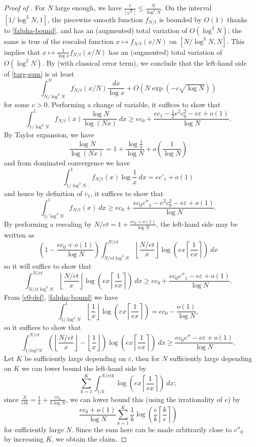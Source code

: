 \documentclass[10pt,a4paper,reqno]{amsart}
\numberwithin{equation}{section}
\theoremstyle{plain}
\theoremstyle{definition}
\newcommand\eps{\varepsilon}
\begin{document}
\begin{proof}[Proof of ]
    For $N$ large enough, we have $\frac{t}{\lfloor\sqrt{t}\rfloor} \leq \frac{N}{\log^3 N}$.
    On the interval $[1/\log^3 N,1]$, the piecewise smooth function $f_{N/t}$ is bounded by $O(1)$ thanks to \eqref{falpha-bound}, and has an (augmented) total variation of $O(\log^3\! N)$; the same is true of the rescaled function $x \mapsto f_{N/t}(x/N)$ on $[N/\log^3\! N,N]$.   This implies that $x \mapsto \frac{1}{\log x} f_{N/t}(x/N)$ has an (augmented) total variation of $O(\log^2 N)$.
   By  (with classical error term), we conclude that the left-hand side of \eqref{targ-sum} is at least
    $$ \int_{N/\log^3 N}^N f_{N/t}(x/N) \frac{dx}{\log x} + O\left( N \exp(-c\sqrt{\log N}) \right)$$
    for some $c>0$.  Performing a change of variable, it suffices to show that
    $$  \int_{1/\log^3 N}^1 f_{N/t}(x) \frac{\log N}{\log(Nx)}\ dx
    \geq  ec_0 + \frac{ec_1 - \frac{1}{2} e^2 c_0^2 - e \eps + o(1)}{\log N}.$$
    By Taylor expansion, we have
    $$ \frac{\log N}{\log(Nx)} = 1 + \frac{\log \frac{1}{x}}{\log N}  + o\left(\frac{1}{\log N}\right)$$
    and from dominated convergence we have
  $$
  \int_{1/\log^3 N}^1 f_{N/t}(x) \log \frac{1}{x}\ dx = ec'_1 + o(1)$$
and hence by definition of $c_1$, it suffices to show that
$$  \int_{1/\log^3 N}^1 f_{N/t}(x)\ dx
\geq  ec_0 + \frac{ec_0 c''_1 - e^2 c_0^2 - e\eps + o(1)}{\log N}.$$
By performing a rescaling by $N/et = 1 + \frac{ec_0+o(1)}{\log N}$, the left-hand side may be written as
$$ \left(1 - \frac{ec_0+o(1)}{\log N}\right) \int_{N/et\log^3 N}^{N/et}
\left\lfloor \frac{N/et}{x} \right\rfloor \log\left(ex \left\lceil \frac{1}{ex} \right\rceil \right)\ dx$$
so it will suffice to show that
$$
\int_{N/et\log^3 N}^{N/et}
\left\lfloor \frac{N/et}{x} \right\rfloor \log\left(ex \left\lceil \frac{1}{ex} \right\rceil \right)\ dx \geq ec_0 + \frac{ec_0 c''_1 - e\eps + o(1)}{\log N}.$$
From \eqref{c0-def}, \eqref{falpha-bound} we have
$$ \int_{1/\log^2 N}^1 \left\lfloor \frac{1}{x} \right\rfloor \log\left(ex \left\lceil \frac{1}{ex} \right\rceil \right) = ec_0 - \frac{o(1)}{\log N},$$
so it suffices to show that
$$
\int_{1/log^2 N}^{N/et}
\left(\left\lfloor \frac{N/et}{x} \right\rfloor - \left\lfloor \frac{1}{x} \right\rfloor\right) \log\left(ex \left\lceil \frac{1}{ex} \right\rceil \right)\ dx \geq \frac{ec_0 c'' - e\eps + o(1)}{\log N}.$$
Let $K$ be sufficiently large depending on $\eps$, then for $N$ sufficiently large depending on $K$ we can lower bound the left-hand side by
$$ \sum_{k=1}^K \int_{1/k}^{N/etk} \log\left(ex \left\lceil \frac{1}{ex} \right\rceil \right)\ dx;$$
since $\frac{N}{etk} = \frac{1}{k} + \frac{ec_0}{k \log N}$, we can lower bound this (using the irrationality of $e$) by
$$ \frac{ec_0+o(1)}{\log N} \sum_{k=1}^K \frac{1}{k} \log\left(\frac{e}{k} \left\lceil \frac{k}{e} \right\rceil\right)$$
for sufficiently large $N$.  Since the sum here can be made arbitrarily close to $c''_0$ by increasing $K$, we obtain the claim.
\end{proof}
\end{document}
